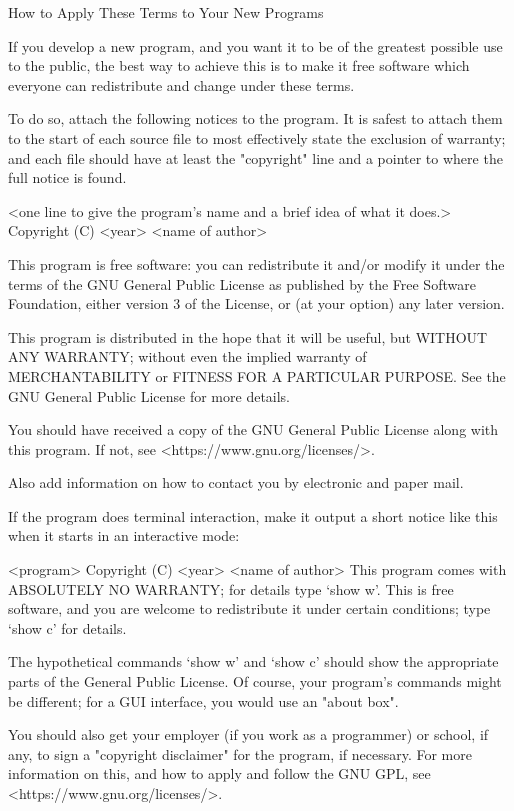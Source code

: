 \documentclass[11pt]{book}
\begin{document}
    How to Apply These Terms to Your New Programs

    If you develop a new program, and you want it to be of the greatest
    possible use to the public, the best way to achieve this is to make it
    free software which everyone can redistribute and change under these terms.

    To do so, attach the following notices to the program.  It is safest
    to attach them to the start of each source file to most effectively
    state the exclusion of warranty; and each file should have at least
    the "copyright" line and a pointer to where the full notice is found.

    <one line to give the program's name and a brief idea of what it does.>
    Copyright (C) <year>  <name of author>

    This program is free software: you can redistribute it and/or modify
    it under the terms of the GNU General Public License as published by
    the Free Software Foundation, either version 3 of the License, or
    (at your option) any later version.

    This program is distributed in the hope that it will be useful,
    but WITHOUT ANY WARRANTY; without even the implied warranty of
    MERCHANTABILITY or FITNESS FOR A PARTICULAR PURPOSE.  See the
    GNU General Public License for more details.

    You should have received a copy of the GNU General Public License
    along with this program.  If not, see <https://www.gnu.org/licenses/>.

    Also add information on how to contact you by electronic and paper mail.

    If the program does terminal interaction, make it output a short
    notice like this when it starts in an interactive mode:

    <program>  Copyright (C) <year>  <name of author>
    This program comes with ABSOLUTELY NO WARRANTY; for details type `show w'.
    This is free software, and you are welcome to redistribute it
    under certain conditions; type `show c' for details.

    The hypothetical commands `show w' and `show c' should show the appropriate
    parts of the General Public License.  Of course, your program's commands
    might be different; for a GUI interface, you would use an "about box".

    You should also get your employer (if you work as a programmer) or school,
    if any, to sign a "copyright disclaimer" for the program, if necessary.
    For more information on this, and how to apply and follow the GNU GPL, see
    <https://www.gnu.org/licenses/>.
\end{document}

